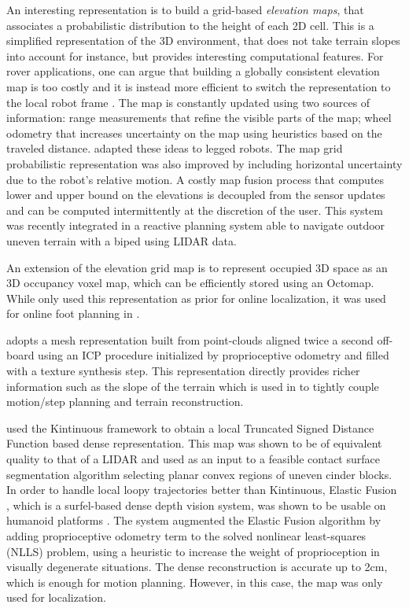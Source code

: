 An interesting representation is to build a grid-based \textit{elevation maps}, that associates a probabilistic distribution to the height of each 2D cell. 
This is a simplified representation of the 3D environment, that does not take terrain slopes into account for instance, but provides interesting computational features. 
For rover applications, one can argue that building a globally consistent elevation map is too costly and it is instead more efficient to switch the representation to 
the local robot frame \cite{kleiner2007real}. 
The map is constantly updated using two sources of information: range measurements that refine the visible parts of the map; wheel odometry that increases uncertainty on the map 
using heuristics based on the traveled distance. \cite{fankhauser2014robot, fankhauser2018probabilistic} adapted these ideas to legged robots. The map grid probabilistic representation
was also improved by including horizontal uncertainty due to the robot's relative motion. A costly map fusion process that computes lower and upper bound on the elevations
is decoupled from the sensor updates and can be computed intermittently at the discretion of the user. This system was recently integrated in a reactive planning system
\cite{huang2021efficient} able to navigate outdoor uneven terrain with a biped using LIDAR data.  

An extension of the elevation grid map is to represent occupied 3D space as an 3D occupancy voxel map, which can be efficiently stored using an Octomap.
While \cite{hornung2014monte, fallon2014drift} only used this representation as prior for online localization, it was used for online foot planning in \cite{winkler2015planning, mastalli2015line}. 

\cite{kolter2009stereo} adopts a mesh representation built from point-clouds aligned twice a second off-board using an ICP procedure initialized by proprioceptive odometry and filled with
a texture synthesis step. This representation directly provides richer information such as the slope of the terrain which is used in \cite{mastalli2020motion} to 
tightly couple motion/step planning and terrain reconstruction.

\cite{fallon2015continuous} used the Kintinuous framework \cite{whelan2012kintinuous} to obtain a local Truncated Signed Distance Function based dense representation. This map was
shown to be of equivalent quality to that of a LIDAR and used as an input to a feasible contact surface segmentation algorithm selecting planar convex regions of uneven cinder blocks. 
In order to handle local loopy trajectories better than Kintinuous, Elastic Fusion \cite{whelan2016elasticfusion}, which is a surfel-based dense depth vision system, 
was shown to be usable on humanoid platforms \cite{scona2017direct}. The system augmented the Elastic Fusion algorithm by adding 
proprioceptive odometry term to the solved nonlinear least-squares (NLLS) problem, using a heuristic to increase the weight of proprioception in visually degenerate situations. The 
dense reconstruction is accurate up to 2cm, which is enough for motion planning. However, in this case, the map was only used for localization.

